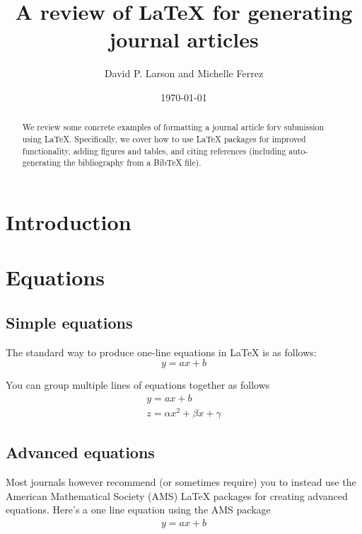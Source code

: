 \documentclass[10pt]{article}
\title{A review of LaTeX for generating journal articles}
\author{David P. Larson and Michelle Ferrez}
\date{\today}  %
\begin{document}
\maketitle

\begin{abstract}
    We review some concrete examples of formatting a journal article forv
    submission using LaTeX. Specifically, we cover how to use LaTeX packages
    for improved functionality, adding figures and tables, and citing
    references (including auto-generating the bibliography from a BibTeX file).
\end{abstract}


\section{Introduction}


\section{Equations}

\subsection{Simple equations}
The standard way to produce one-line equations in LaTeX is as follows:
\begin{equation}
    y = ax + b
\end{equation}

You can group multiple lines of equations together as follows
\begin{eqnarray}
    y = ax + b \\
    z = \alpha x^2 + \beta x + \gamma
\end{eqnarray}

\subsection{Advanced equations}
Most journals however recommend (or sometimes require) you to instead use the
American Mathematical Society (AMS) LaTeX packages for creating advanced
equations. Here's a one line equation using the AMS package
\begin{align}
    y = ax + b
\end{align}
\end{document}

